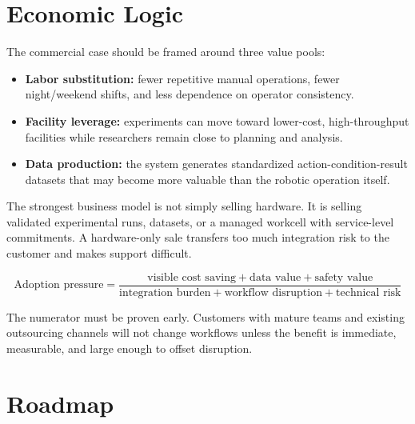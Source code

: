 \documentclass[11pt]{article}
\begin{document}
\section{Economic Logic}

The commercial case should be framed around three value pools:

\begin{itemize}
  \item \textbf{Labor substitution:} fewer repetitive manual operations, fewer night/weekend shifts, and less dependence on operator consistency.
  \item \textbf{Facility leverage:} experiments can move toward lower-cost, high-throughput facilities while researchers remain close to planning and analysis.
  \item \textbf{Data production:} the system generates standardized action-condition-result datasets that may become more valuable than the robotic operation itself.
\end{itemize}

The strongest business model is not simply selling hardware. It is selling validated experimental runs, datasets, or a managed workcell with service-level commitments. A hardware-only sale transfers too much integration risk to the customer and makes support difficult.

\[
\text{Adoption pressure} =
\frac{\text{visible cost saving} + \text{data value} + \text{safety value}}
{\text{integration burden} + \text{workflow disruption} + \text{technical risk}}
\]

The numerator must be proven early. Customers with mature teams and existing outsourcing channels will not change workflows unless the benefit is immediate, measurable, and large enough to offset disruption.

\section{Roadmap}
\end{document}
